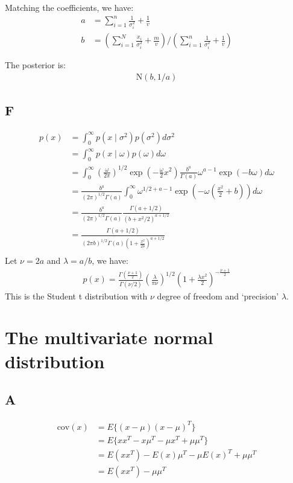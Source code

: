 \documentclass{article}
\begin{document}
Matching the coefficients, we have:
\begin{align*}
a &= \sum_{i=1}^n\frac{1}{\sigma_i^2} + \frac{1}{v}\\
b &= \left(\sum_{i=1}^N\frac{x_i}{\sigma_i^2} + \frac{m}{v} \right) / \left( \sum_{i=1}^n\frac{1}{\sigma_i^2} + \frac{1}{v}\right)
\end{align*}

The posterior is:
\begin{align*}
\mbox{N}(b, 1/a)
\end{align*}

\subsection*{F}
\begin{align*}
p(x) &= \int_{0}^{\infty} p(x\mid \sigma^2) p(\sigma^2) d\sigma^2\\
&= \int_{0}^{\infty} p(x\mid \omega) p(\omega) d\omega\\
&= \int_{0}^{\infty} \left(\frac{\omega}{2\pi}\right)^{1/2}\exp\left(-\frac{\omega}{2}x^2\right)\frac{b^a}{\Gamma(a)}\omega^{a-1}\exp(-b\omega) d\omega\\
&= \frac{b^a}{(2\pi)^{1/2}\Gamma(a)} \int_{0}^{\infty} \omega^{1/2 + a - 1}\exp\left(-\omega\left(\frac{x^2}{2} + b\right)\right) d\omega\\
&= \frac{b^a}{(2\pi)^{1/2}\Gamma(a)} \frac{\Gamma(a+1/2)}{(b+x^2/2)^{a+1/2}} \tag{Gamma integral}\\
&= \frac{\Gamma(a+1/2)}{(2\pi b)^{1/2}\Gamma(a)(1+\frac{x^2}{2b})^{a+1/2}}\\
\end{align*}
Let \(\nu = 2a\) and \(\lambda = a/b\), we have:
\begin{align*}
p(x) = \frac{\Gamma(\frac{\nu+1}{2})}{\Gamma(\nu/2)} \left(\frac{\lambda}{\pi \nu}\right)^{1/2} \left(1 + \frac{\lambda x^2}{2}\right)^{-\frac{\nu+1}{2}}
\end{align*}
This is the Student t distribution with \(\nu\) degree of freedom and `precision' \(\lambda\).

\section{The multivariate normal distribution}
\subsection*{A}
\begin{align*}
\mbox{cov}(x) &= E\{(x - \mu)(x - \mu)^T\}\\
&= E\{xx^T - x\mu^T - \mu x^T + \mu\mu^T\}\\
&= E(xx^T) - E(x)\mu^T - \mu E(x)^T + \mu \mu^T\\
&=E(xx^T) - \mu \mu^T
\end{align*}
\end{document}
